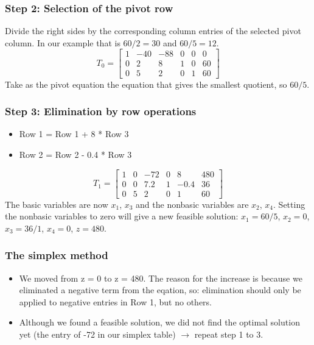 \begin{frame}
  \frametitle{Step 2: Selection of the pivot row}
  Divide the right sides by the corresponding column entries of the selected pivot column. In our example that is $60/2 = 30$ and $60/5 = 12$.
     \[
T_0 = \begin{bmatrix}
1 & -40 & -88 & 0 & 0 & 0\\ 
0 & 2 & 8 & 1 & 0 & 60\\
0 & 5 & 2 & 0 & 1 &60 
\end{bmatrix}
   \]
   Take as the pivot equation the equation that gives the smallest quotient, so $60/5$.
\end{frame}

\begin{frame}
  \frametitle{Step 3: Elimination by row operations}
  \begin{itemize}
    \item Row 1 = Row 1 + 8 * Row 3
    \item Row 2 = Row 2 - 0.4 * Row 3
  \end{itemize}
     \[
T_1 = \begin{bmatrix}
1 & 0 & -72 & 0 & 8 & 480\\ 
0 & 0 & 7.2 & 1 & -0.4 & 36\\
0 & 5 & 2 & 0 & 1 &60 
\end{bmatrix}
   \]
   The basic variables are now $x_1$, $x_3$ and the nonbasic variables are $x_2$, $x_4$. Setting the nonbasic variables to zero will give a new feasible solution: $x_1 = 60/5$, $x_2 = 0$, $x_3 = 36/1$, $x_4 = 0$, $z =480$.
\end{frame}

\begin{frame}
  \frametitle{The simplex method}
  \begin{itemize}
    \item We moved from z = 0 to z = 480. The reason for the increase is because we eliminated a negative term from the eqation, so: elimination should only be applied to negative entries in Row 1, but no others.
    \item Although we found a feasible solution, we did not find the optimal solution yet (the entry of -72 in our simplex table) $\longrightarrow$ repeat step 1 to 3. 
  \end{itemize}
\end{frame}

